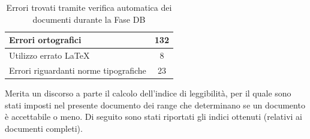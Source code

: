 				\begin{table}[H]
					\centering
					\begin{tabu}{| l | c |}
						\hline
						Errori ortografici	&132	\\ \hline
						Utilizzo errato \LaTeX{}	&8	\\ \hline
						Errori riguardanti norme tipografiche	&23	\\ \hline
					\end{tabu}
					\caption{Errori trovati tramite verifica automatica dei documenti durante la Fase DB}
				\end{table}
				Merita un discorso a parte il calcolo dell'indice di leggibilità, per il quale sono stati imposti nel presente documento dei range che 
				determinano se un documento è accettabile o meno. Di seguito sono stati riportati gli indici ottenuti (relativi ai documenti completi).
				
